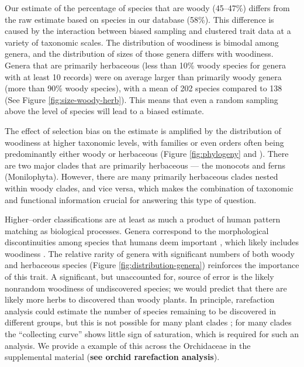 \documentclass[a4paper,12pt]{article}
\begin{document}
%
Our estimate of the percentage of species that are woody (45--47\%)
differs from the raw estimate based on species in our database (58\%).
This difference is caused by the interaction between biased sampling
and clustered trait data at a variety of taxonomic scales.
%
The distribution of woodiness is bimodal among genera, and the
distribution of sizes of those genera differs with woodiness.  Genera
that are primarily herbaceous (less than 10\% woody species for genera
with at least 10 records) were on average larger than primarily woody
genera (more than 90\% woody species), with a mean of 202 species
compared to 138 (See Figure \ref{fig:size-woody-herb}). 
This means that even a random sampling above the
level of species will lead to a biased estimate.

The effect of selection bias on the estimate is amplified by the distribution of woodiness at higher
taxonomic levels, with families or even orders often being
predominantly either woody or herbaceous (Figure \ref{fig:phylogeny} and
\citealt{sinnott1915evolution}).  There are two major clades that are
primarily herbaceous --- the monocots and ferns
(Monilophyta). However, there are many primarily herbaceous clades
nested within woody clades, and vice versa, which makes the
combination of taxonomic and functional information crucial for
answering this type of question.  

Higher--order classifications are at least as much a product of human
pattern matching as biological processes.  Genera correspond to the
morphological discontinuities among species that humans deem important
\citep{scotland2004significance}, which likely includes woodiness
\citep[e.g.,][]{Hutchinson}.  The relative rarity of genera with
significant numbers of both woody and herbaceous species (Figure
\ref{fig:distribution-genera}) reinforces the importance of this
trait.  A significant, but unaccounted for, source of error is the likely
nonrandom woodiness of undiscovered species; we would predict that
there are likely more herbs to discovered than woody plants.  In principle,
rarefaction analysis could estimate the number of species remaining to
be discovered in different groups, but this is not possible for many
plant clades \citep{costello2011}; for many clades the ``collecting curve'' 
shows little sign of saturation, which is required for such an analysis.
We provide a example of this across the Orchidaceae in the supplemental material
(\textbf{see orchid rarefaction analysis}).
\end{document}
